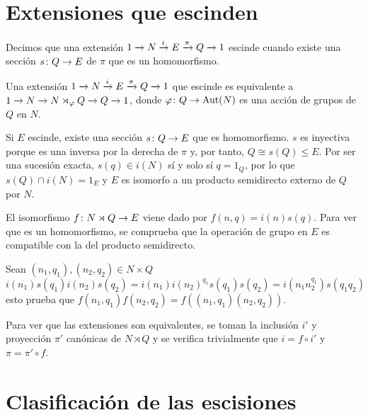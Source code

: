 
\section{Extensiones que escinden}\label{sec:split}


\begin{definicion}	
	Decimos que una extensión $\extension i \pi N E Q$ escinde cuando existe una sección $\homo s Q E$ de $\pi$ que es un homomorfismo.
\end{definicion}

\begin{teorema}\label{splitext}
	Una extensión $\extension i \pi N E Q$ que escinde es equivalente a $\extension {} {} N {N\rtimes_{\varphi} Q} Q$, donde $\homo \varphi Q \Aut(N)$ es una acción de grupos de $Q$ en $N$.
	\begin{demostracion}
		Si $E$ escinde, existe una sección $\homo s Q E$ que es homomorfismo. $s$ es inyectiva porque es una inversa por la derecha de $\pi$ y, por tanto, $Q\cong s(Q) \leq E$.
		Por ser una sucesión exacta, $s(q)\in i(N)$ sí y solo sí $q = 1_Q$, por lo que $s(Q)\cap i(N) = {1_E}$ y $E$ es isomorfo a un producto semidirecto externo de $Q$ por $N$.
		
		El isomorfismo $\homo f {N\rtimes Q} E$ viene dado por $f(n,q) = i(n)s(q)$. Para ver que es un homomorfismo, se comprueba que la operación de grupo en $E$ es compatible con la del producto semidirecto.
		
		Sean $(n_1,q_1),(n_2,q_2)\in N\times Q$
		\begin{equation*}
			i(n_1)s(q_1)i(n_2)s(q_2) = i(n_1)i(n_2)^{q_1}s(q_1)s(q_2) = i(n_1 n_2^{q_1})s(q_1q_2) 
		\end{equation*}
		esto prueba que $f(n_1,q_1)f(n_2,q_2) = f((n_1,q_1)(n_2,q_2))$.
		
		Para ver que las extensiones son equivalentes, se toman la inclusión $i'$ y proyección $\pi'$ canónicas de $N\rtimes Q$ y se verifica trivialmente que $i=f \circ i'$ y $\pi = \pi' \circ f$.
	\end{demostracion}
\end{teorema}


\section{Clasificación de las escisiones}

